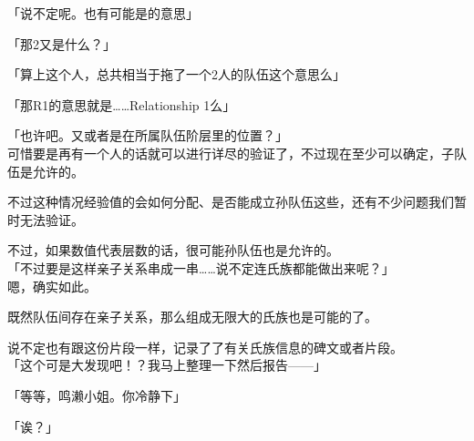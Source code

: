 「说不定呢。也有可能是的意思」

「那2又是什么？」

「算上这个人，总共相当于拖了一个2人的队伍这个意思么」

「那R1的意思就是……Relationship 1么」

「也许吧。又或者是在所属队伍阶层里的位置？」\\

可惜要是再有一个人的话就可以进行详尽的验证了，不过现在至少可以确定，子队伍是允许的。

不过这种情况经验值的会如何分配、是否能成立孙队伍这些，还有不少问题我们暂时无法验证。

不过，如果数值代表层数的话，很可能孙队伍也是允许的。\\

「不过要是这样亲子关系串成一串……说不定连氏族都能做出来呢？」\\

嗯，确实如此。

既然队伍间存在亲子关系，那么组成无限大的氏族也是可能的了。

说不定也有跟这份片段一样，记录了了有关氏族信息的碑文或者片段。\\

「这个可是大发现吧！？我马上整理一下然后报告——」

「等等，鸣濑小姐。你冷静下」

「诶？」\\

